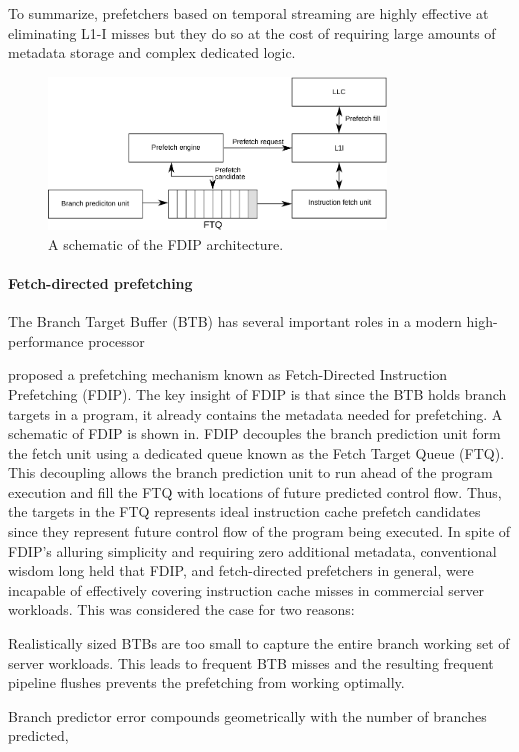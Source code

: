 \documentclass[../main.tex]{subfiles}
\begin{document}
\begin{refsection}
To summarize, prefetchers based on temporal streaming are highly effective at eliminating L1-I misses but they do so at the cost of requiring large amounts of metadata storage and complex dedicated logic.

\begin{figure}[ht]
  \centering
  \includegraphics[width=0.8\textwidth]{figures/fdip1.pdf}
  \caption{\label{fig:fdip} A schematic of the FDIP architecture.}
\end{figure}

\paragraph{Fetch-directed prefetching}
The Branch Target Buffer (BTB) has several important roles in a modern high-performance processor

\textcite{reinman99_fetch_direc_instr_prefet} proposed a prefetching
mechanism known as Fetch-Directed Instruction Prefetching (FDIP). The
key insight of FDIP is that since the BTB holds branch targets in a
program, it already contains the metadata needed for prefetching. A
schematic of FDIP is shown in. FDIP decouples the
branch prediction unit form the fetch unit using a dedicated queue
known as the Fetch Target Queue (FTQ). This decoupling allows the
branch prediction unit to run ahead of the program execution and fill
the FTQ with locations of future predicted control flow. Thus, the
targets in the FTQ represents ideal instruction cache prefetch
candidates since they represent future control flow of the program
being executed. In spite of FDIP's alluring simplicity and requiring
zero additional metadata, conventional wisdom long held that FDIP, and
fetch-directed prefetchers in general, were incapable of effectively
covering instruction cache misses in commercial server workloads. This was considered the case for two reasons: \begin{inparaenum}  \item Realistically sized BTBs are too small to capture the entire branch working set of server workloads. This leads to frequent BTB misses and the resulting frequent pipeline flushes prevents the prefetching from working optimally. \item Branch predictor error compounds geometrically with the number of branches predicted, 
\end{inparaenum}



\end{refsection}
\end{document}
